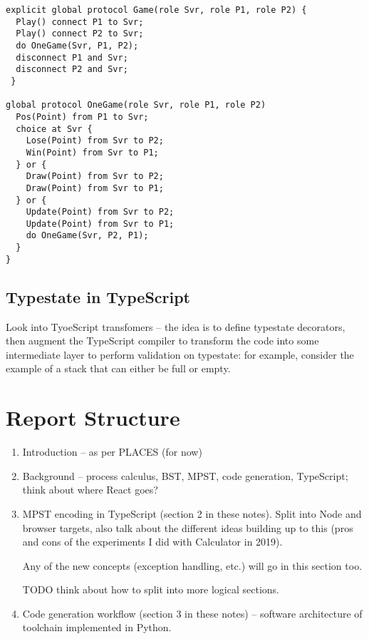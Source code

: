 \documentclass{article}
\begin{document}
\begin{lstlisting}
explicit global protocol Game(role Svr, role P1, role P2) {
  Play() connect P1 to Svr;
  Play() connect P2 to Svr;
  do OneGame(Svr, P1, P2);
  disconnect P1 and Svr;
  disconnect P2 and Svr;
 }

global protocol OneGame(role Svr, role P1, role P2)
  Pos(Point) from P1 to Svr;
  choice at Svr {
    Lose(Point) from Svr to P2;
    Win(Point) from Svr to P1;
  } or {
    Draw(Point) from Svr to P2;
    Draw(Point) from Svr to P1;
  } or {
    Update(Point) from Svr to P2;
    Update(Point) from Svr to P1;
    do OneGame(Svr, P2, P1);
  }
}

\end{lstlisting}

\subsection*{Typestate in TypeScript}

Look into TyoeScript transfomers -- the idea is
to define typestate decorators, then augment the
TypeScript compiler to transform the code into some
intermediate layer to perform validation on
typestate: for example, consider the example of a 
stack that can either be full or empty.

\section{Report Structure}

\begin{enumerate}
\item 
Introduction -- as per PLACES (for now)

\item
Background -- process calculus, BST, MPST, code 
generation, TypeScript; think about where React goes?

\item
MPST encoding in TypeScript (section 2 in these notes).
Split into Node and browser targets, also talk about
the different ideas building up to this (pros and
cons of the experiments I did with Calculator in
2019).

Any of the new concepts (exception handling, etc.) will 
go in this section too.

TODO think about how to split into 
more logical sections.

\item
Code generation workflow (section 3 in these notes)
-- software architecture of
toolchain implemented in Python.

\end{enumerate}

\nocite{*}


\end{document}
